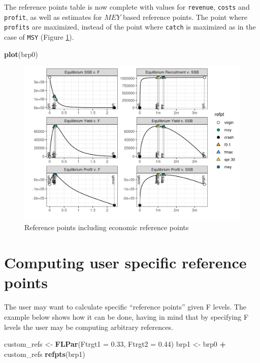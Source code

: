\documentclass[
]{book}
\newenvironment{Shaded}{\begin{snugshade}}{\end{snugshade}}
\newcommand{\AttributeTok}[1]{\textcolor[rgb]{0.13,0.29,0.53}{#1}}
\newcommand{\FloatTok}[1]{\textcolor[rgb]{0.00,0.00,0.81}{#1}}
\newcommand{\FunctionTok}[1]{\textcolor[rgb]{0.13,0.29,0.53}{\textbf{#1}}}
\newcommand{\NormalTok}[1]{#1}
\newcommand{\OtherTok}[1]{\textcolor[rgb]{0.56,0.35,0.01}{#1}}
\newcommand{\SpecialCharTok}[1]{\textcolor[rgb]{0.81,0.36,0.00}{\textbf{#1}}}
\begin{document}
The reference points table is now complete with values for \texttt{revenue}, \texttt{costs} and \texttt{profit}, as well as estimates for \(MEY\) based reference points. The point where \texttt{profits} are maximized, instead of the point where \texttt{catch} is maximized as in the case of \texttt{MSY} (Figure \ref{fig:ecorp}).

\begin{Shaded}
\begin{Highlighting}[]
\FunctionTok{plot}\NormalTok{(brp0)}
\end{Highlighting}
\end{Shaded}

\begin{figure}
\centering
\includegraphics{_bookdown_files/_main_files/figure-html/ecorp-1.png}
\caption{\label{fig:ecorp}Reference points including economic reference points}
\end{figure}

\hypertarget{computing-user-specific-reference-points}{%
\section{Computing user specific reference points}\label{computing-user-specific-reference-points}}

The user may want to calculate specific ``reference points'' given F levels. The example below shows how it can be done, having in mind that by specifying F levels the user may be computing arbitrary references.

\begin{Shaded}
\begin{Highlighting}[]
\NormalTok{custom\_refs }\OtherTok{\textless{}{-}} \FunctionTok{FLPar}\NormalTok{(}\AttributeTok{Ftrgt1 =} \FloatTok{0.33}\NormalTok{, }\AttributeTok{Ftrgt2 =} \FloatTok{0.44}\NormalTok{)}
\NormalTok{brp1 }\OtherTok{\textless{}{-}}\NormalTok{ brp0 }\SpecialCharTok{+}\NormalTok{ custom\_refs}
\FunctionTok{refpts}\NormalTok{(brp1)}
\end{Highlighting}
\end{Shaded}
\end{document}
